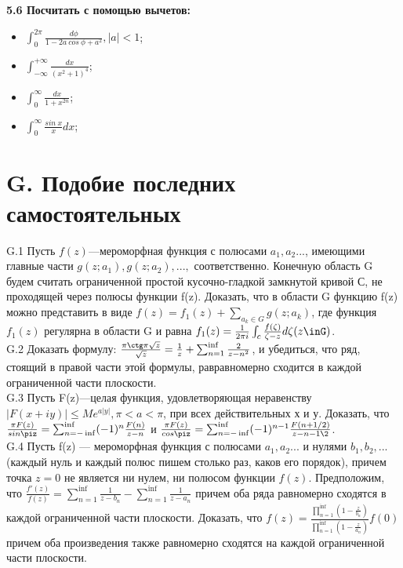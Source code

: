 \documentclass{article}
\begin{document}
\textbf{5.6 Посчитать с помощью вычетов:}
\begin{itemize}
\item $\int_0^{2\pi} \frac{d\phi}{1-2a~cos~\phi+a^2}, \vert a \vert < 1$;
\item $\int_{-\infty}^{+\infty}\frac{dx}{(x^2+1)^4}$;
\item $\int_0^{\infty}\frac{dx}{1+x^{2n}}$;
\item $\int_0^{\infty}\frac{sin~x}{x}dx$;
\end{itemize}

\section*{G. Подобие последних самостоятельных}
G.1 Пусть $f(z)$—мероморфная функция с полюсами $a_1, a_2 ...$,
имеющими главные части $g(z;a_1), g(z; a_2), ...,$ соответственно. Конечную область G будем считать ограниченной простой кусочно-гладкой замкнутой кривой С, не проходящей через полюсы функции f(z).
Доказать, что в области G функцию f(z) можно представить в виде $f(z)=f_1(z)+\sum_{a_k \in G}g(z;a_k)$,
где функция $f_1(z)$ регулярна в области G и равна $f_1(z)=\frac{1}{2\pi i}\int_c\frac{f(\zeta)}{\zeta-z}d\zeta (z\inG)$.\\
G.2 Доказать формулу: $\frac{\pi\ctg \pi\sqrt{z}}{\sqrt{z}}=\frac{1}{z}+\sum_{n=1}^{\inf} \frac{2}{z-n^2}$, и убедиться, что ряд, стоящий в правой части этой формулы, равравномерно сходится в каждой ограниченной части плоскости.\\
G.3 Пусть F(z)—целая функция, удовлетворяющая неравенству $\vert F(x+iy)\vert \leq Me^{a\vert y \vert}, \pi <a<\pi$, при всех действительных х и у. Доказать, что $\frac{\pi F(z)}{sin\piz}=\sum_{n=-\inf}^{\inf} (-1)^n\frac{F(n)}{z-n}$  и $\frac{\pi F(z)}{cos\piz}=\sum_{n=-\inf}^{\inf} (-1)^{n-1}\frac{F(n+1/2)}{z-n-1\2}$. \\
G.4 Пусть f(z) — мероморфная функция с полюсами $a_1, a_2 ...$ и нулями $b_1, b_2, ...$ (каждый нуль и каждый полюс пишем столько раз, каков его порядок), причем точка $z = 0$ не является ни нулем,
ни полюсом функции $f(z)$. Предположим, что $\frac{f'(z)}{f(z)}=\sum_{n=1}^{\inf} \frac{1}{z-b_n}-\sum_{n=1}^{\inf} \frac{1}{z-a_n}$ причем оба ряда равномерно сходятся в каждой ограниченной части
плоскости. Доказать, что $f(z)=\frac{\prod_{n=1}^{\inf} (1-\frac{z}{b_n})}{\prod_{n=1}^{\inf} (1-\frac{z}{a_n})}f(0)$ причем оба произведения также равномерно сходятся на каждой ограниченной части плоскости.
\end{document}
